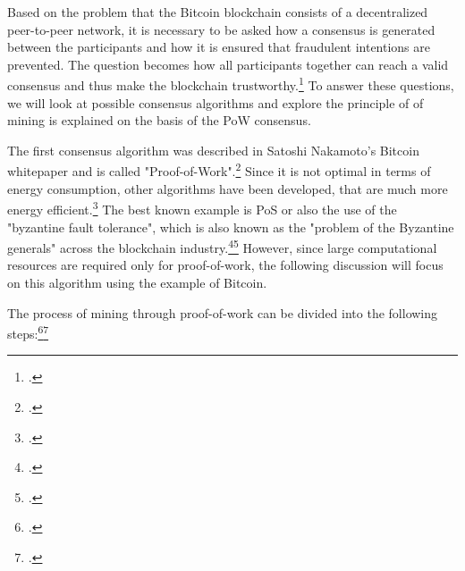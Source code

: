 Based on the problem that the Bitcoin blockchain consists of a decentralized peer-to-peer network, it is necessary to
be asked how a consensus is generated between the participants and how it is ensured
that fraudulent intentions are prevented. The question becomes how all participants together can reach a valid
consensus and thus make the blockchain trustworthy.\footcite[Cf.][Fig. 3]{derks2018chaining}
To answer these questions, we will look at possible consensus algorithms and explore the principle of
of mining is explained on the basis of the \ac{PoW} consensus.

The first consensus algorithm was described in Satoshi Nakamoto's Bitcoin whitepaper and is called
"Proof-of-Work".\footcite[Cf.][p. 3]{nakamoto2008bitcoin} Since it is not optimal in terms of energy consumption, other algorithms have been developed,
that are much more energy efficient.\footcite[Cf.][]{dwcom2021bitcoin} The best known example is \ac{PoS} or also the use of the
"byzantine fault tolerance", which is also known as the "problem of the Byzantine generals" across the blockchain
industry.\footcite[Cf.][p. 2]{friedlmaier2018disrupting}\footcite[Cf.][p. 746]{mukhopadhyay2016brief}
However, since large computational resources are required only for proof-of-work, the following discussion will focus on this algorithm
using the example of Bitcoin.

The process of mining through proof-of-work can be divided into the following steps:\footcite[Cf.][p. 3]{nakamoto2008bitcoin}\footcite[Cf.][p. 51]{li2019blockchain}

